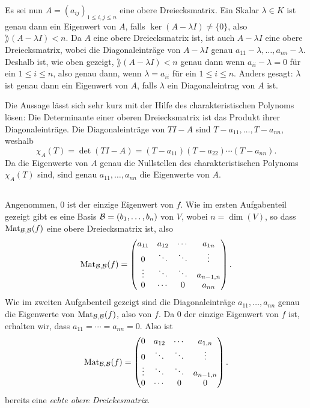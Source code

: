 \documentclass[a4paper,10pt]{scrartcl}
\begin{document}
Es sei nun $A = (a_{ij})_{1 \leq i,j \leq n}$ eine obere Dreiecksmatrix. Ein Skalar $\lambda \in K$ ist genau dann ein Eigenwert von $A$, falls $\ker(A - \lambda I) \neq \{0\}$, also $\rang(A - \lambda I) < n$. Da $A$ eine obere Dreiecksmatrix ist, ist auch $A - \lambda I$ eine obere Dreiecksmatrix, wobei die Diagonaleinträge von $A - \lambda I$ genau $a_{11} - \lambda, \dotsc, a_{nn} - \lambda$. Deshalb ist, wie oben gezeigt, $\rang(A - \lambda I) < n$ genau dann wenn $a_{ii} - \lambda = 0$ für ein $1 \leq i \leq n$, also genau dann, wenn $\lambda = a_{ii}$ für ein $1 \leq i \leq n$. Anders gesagt: $\lambda$ ist genau dann ein Eigenwert von $A$, falls $\lambda$ ein Diagonaleintrag von $A$ ist.

\begin{bem}
 Die Aussage lässt sich sehr kurz mit der Hilfe des charakteristischen Polynoms lösen: Die Determinante einer oberen Dreiecksmatrix ist das Produkt ihrer Diagonaleinträge. Die Diagonaleinträge von $TI - A$ sind $T - a_{11}, \dotsc, T - a_{nn}$, weshalb
 \[
  \chi_A(T)
  = \det(TI - A)
  = (T - a_{11})(T - a_{22}) \dotsm (T - a_{nn}).
 \]
 Da die Eigenwerte von $A$ genau die Nullstellen des charakteristischen Polynoms $\chi_A(T)$ sind, sind genau $a_{11}, \dotsc, a_{nn}$ die Eigenwerte von $A$.
\end{bem}






\subsection{}
Angenommen, $0$ ist der einzige Eigenwert von $f$. Wie im ersten Aufgabenteil gezeigt gibt es eine Basis $\mathcal{B} = (b_1, \dotsc, b_n)$ von $V$, wobei $n = \dim(V)$, so dass $\mathrm{Mat}_{\mathcal{B},\mathcal{B}}(f)$ eine obere Dreiecksmatrix ist, also
\[
 \mathrm{Mat}_{\mathcal{B},\mathcal{B}}(f)
 =
 \begin{pmatrix}
  a_{11} & a_{12} & \cdots & a_{1n}    \\
  0      & \ddots & \ddots & \vdots    \\
  \vdots & \ddots & \ddots & a_{n-1,n} \\
  0      & \cdots & 0      & a_{nn}
 \end{pmatrix}.
\]
Wie im zweiten Aufgabenteil gezeigt sind die Diagonaleinträge $a_{11}, \dotsc, a_{nn}$ genau die Eigenwerte von $\mathrm{Mat}_{\mathcal{B},\mathcal{B}}(f)$, also von $f$. Da $0$ der einzige Eigenwert von $f$ ist, erhalten wir, dass $a_{11} = \dotsb = a_{nn} = 0$. Also ist
\[
 \mathrm{Mat}_{\mathcal{B},\mathcal{B}}(f)
 =
 \begin{pmatrix}
  0      & a_{12} & \cdots & a_{1,n}    \\
  0      & \ddots & \ddots & \vdots    \\
  \vdots & \ddots & \ddots & a_{n-1,n} \\
  0      & \cdots & 0      & 0
 \end{pmatrix}.
\]
bereits eine \emph{echte obere Dreickesmatrix}.
\end{document}
